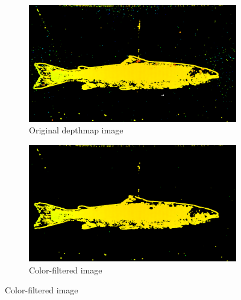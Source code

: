 \begin{figure}[H]
    \begin{subfigure}{0.48\textwidth}
        \includegraphics[width=\linewidth]{images/implementation/1_original}
        \caption{Original depthmap image} 
        \label{fig:original_depthmap}
    \end{subfigure}\hspace*{\fill}
    \begin{subfigure}{0.48\textwidth}
        \includegraphics[width=\linewidth]{images/implementation/2_color_filtering}
        \caption{Color-filtered image} 
        \label{fig:color_filtering}
    \end{subfigure}
    

\end{figure}
